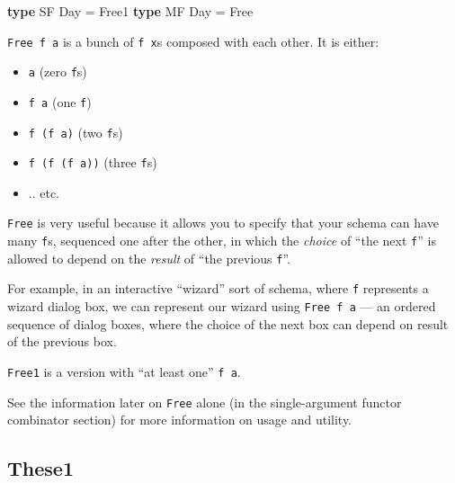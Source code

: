 \documentclass[]{article}
\newenvironment{Shaded}{}{}
\newcommand{\DataTypeTok}[1]{\textcolor[rgb]{0.56,0.13,0.00}{#1}}
\newcommand{\KeywordTok}[1]{\textcolor[rgb]{0.00,0.44,0.13}{\textbf{#1}}}
\newcommand{\OtherTok}[1]{\textcolor[rgb]{0.00,0.44,0.13}{#1}}
\begin{document}
\begin{itemize}
\begin{Shaded}
\begin{Highlighting}[]
\KeywordTok{type} \DataTypeTok{SF} \DataTypeTok{Day} \OtherTok{=} \DataTypeTok{Free1}
\KeywordTok{type} \DataTypeTok{MF} \DataTypeTok{Day} \OtherTok{=} \DataTypeTok{Free}
\end{Highlighting}
\end{Shaded}

  \texttt{Free\ f\ a} is a bunch of \texttt{f\ x}s composed with each other. It
  is either:

  \begin{itemize}
  \tightlist
  \item
    \texttt{a} (zero \texttt{f}s)
  \item
    \texttt{f\ a} (one \texttt{f})
  \item
    \texttt{f\ (f\ a)} (two \texttt{f}s)
  \item
    \texttt{f\ (f\ (f\ a))} (three \texttt{f}s)
  \item
    .. etc.
  \end{itemize}

  \texttt{Free} is very useful because it allows you to specify that your schema
  can have many \texttt{f}s, sequenced one after the other, in which the
  \emph{choice} of ``the next \texttt{f}'' is allowed to depend on the
  \emph{result} of ``the previous \texttt{f}''.

  For example, in an interactive ``wizard'' sort of schema, where \texttt{f}
  represents a wizard dialog box, we can represent our wizard using
  \texttt{Free\ f\ a} --- an ordered sequence of dialog boxes, where the choice
  of the next box can depend on result of the previous box.

  \texttt{Free1} is a version with ``at least one'' \texttt{f\ a}.

  See the information later on \texttt{Free} alone (in the single-argument
  functor combinator section) for more information on usage and utility.
\end{itemize}

\hypertarget{these1}{%
\subsection{These1}\label{these1}}
\end{document}
